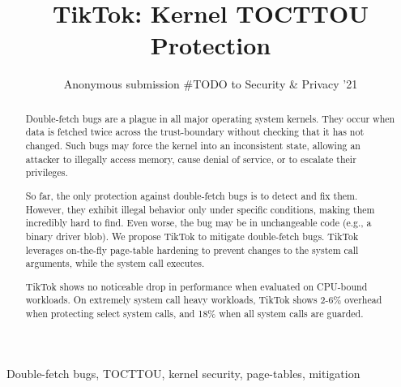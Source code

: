 \documentclass[conference]{IEEEtran}
\newcommand{\sysname}{TikTok}
\newcommand{\roughevaloverheadbad}{18\%}
\newcommand{\roughevaloverheadbetter}{2-6\%}
\begin{document}

\date{}

\title{\Large \bf TikTok: Kernel TOCTTOU Protection}

\author{
Anonymous submission \#TODO to Security \& Privacy '21
} %

\maketitle

\begin{abstract}

Double-fetch bugs are a plague in all major operating system kernels.  They
occur when data is fetched twice across the trust-boundary without checking that
it has not changed. Such bugs may force the kernel into an inconsistent state,
allowing an attacker to illegally access memory, cause denial of service, or to
escalate their privileges.

So far, the only protection against double-fetch bugs is to detect and fix them.
However, they exhibit illegal behavior only under specific conditions, making
them incredibly hard to find. Even worse, the bug may be in unchangeable code
(e.g., a binary driver blob).
%
We propose \sysname{} to mitigate double-fetch bugs.  \sysname{} leverages
on-the-fly page-table hardening to prevent changes to the system call arguments,
while the system call executes.

\sysname{} shows no noticeable drop in performance when evaluated on CPU-bound
workloads. On extremely system call heavy workloads, \sysname{} shows
\roughevaloverheadbetter{} overhead when protecting select system calls, and
\roughevaloverheadbad{} when all system calls are guarded.


\end{abstract}

\begin{IEEEkeywords}
Double-fetch bugs, TOCTTOU, kernel security, page-tables, mitigation
\end{IEEEkeywords}
\end{document}
